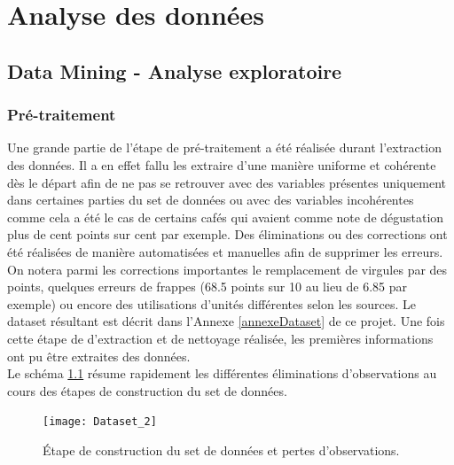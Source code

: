 
\chapter{Analyse des données}
\minitoc

\newpage
\section{Data Mining - Analyse exploratoire}
\subsection{Pré-traitement}



Une grande partie de l'étape de pré-traitement a été réalisée durant l'extraction des données. Il a en effet fallu les extraire d'une manière uniforme et cohérente dès le départ afin de ne pas se retrouver avec des variables présentes uniquement dans certaines parties du set de données ou avec des variables incohérentes comme cela a été le cas de certains cafés qui avaient comme note de dégustation plus de cent points sur cent par exemple. Des éliminations ou des corrections ont été réalisées de manière automatisées et manuelles afin de supprimer les erreurs. On notera parmi les corrections importantes le remplacement de virgules par des points, quelques erreurs de frappes (68.5 points sur 10 au lieu de 6.85 par exemple) ou encore des utilisations d'unités différentes selon les sources. Le dataset résultant est décrit dans l'Annexe \ref{annexeDataset} de ce projet. Une fois cette étape de d'extraction et de nettoyage réalisée, les premières informations ont pu être extraites des données.\\


\noindent Le schéma \ref{DatasetMaking} résume rapidement les différentes éliminations d'observations au cours des étapes de construction du set de données. 

\begin{figure}[H]
	\texttt{[image: Dataset\_2]}
	\caption{\label{DatasetMaking} Étape de construction du set de données et pertes d'observations.}
\end{figure}



